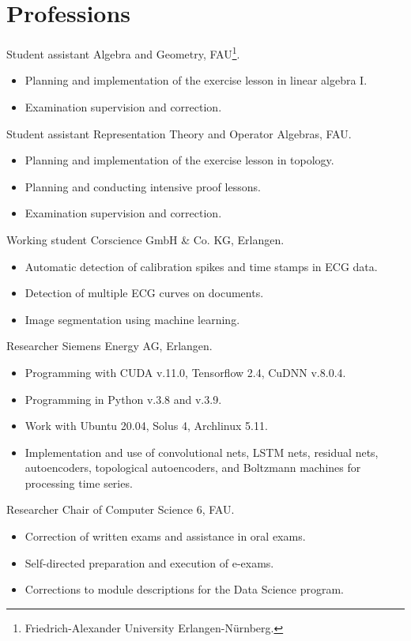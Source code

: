 \documentclass[a4paper,11pt]{article}
\newcommand{\years}[1]{\marginnote{\scriptsize #1}}
\begin{document}
\section*{Professions}
\years{2024} Student assistant Algebra and Geometry, FAU\footnote{Friedrich-Alexander University Erlangen-Nürnberg.}.
\begin{itemize}
    \item Planning and implementation of the exercise lesson in linear algebra I.
    \item Examination supervision and correction.
\end{itemize}
\years{2023} Student assistant Representation Theory and Operator Algebras, FAU.
\begin{itemize}
    \item Planning and implementation of the exercise lesson in topology.
    \item Planning and conducting intensive proof lessons.
    \item Examination supervision and correction.
\end{itemize}
\years{2021--22} Working student Corscience GmbH \& Co. KG, Erlangen.
\begin{itemize}
    \item Automatic detection of calibration spikes and time stamps in ECG data.
    \item Detection of multiple ECG curves on documents.
    \item Image segmentation using machine learning.
\end{itemize}
\years{2019--21} Researcher Siemens Energy AG, Erlangen.
\begin{itemize}
    \item Programming with CUDA v.11.0, Tensorflow 2.4, CuDNN v.8.0.4.
    \item Programming in Python v.3.8 and v.3.9.
    \item Work with Ubuntu 20.04, Solus 4, Archlinux 5.11.
    \item Implementation and use of convolutional nets, LSTM nets, residual nets, autoencoders, topological autoencoders, and Boltzmann machines for processing time series.
\end{itemize}
\years{2018--21} Researcher Chair of Computer Science 6, FAU.
\begin{itemize}
    \item Correction of written exams and assistance in oral exams.
    \item Self-directed preparation and execution of e-exams.
    \item Corrections to module descriptions for the Data Science program.
\end{itemize}
\end{document}
